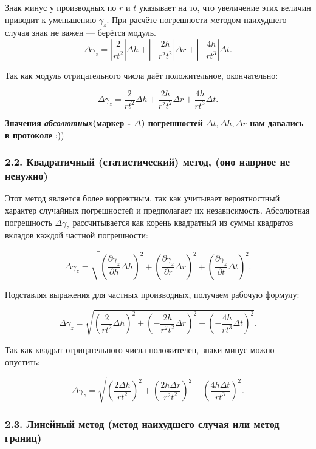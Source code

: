 \documentclass[a4paper,12pt]{article}
\begin{document}
Знак минус у производных по \(r\) и \(t\) указывает на то, что увеличение этих величин приводит к уменьшению \(\gamma_z\). При расчёте погрешности методом наихудшего случая знак не важен — берётся модуль.
\[
\Delta \gamma_z = \left| \frac{2}{r t^2} \right| \Delta h + 
\left| -\frac{2h}{r^2 t^2} \right| \Delta r + 
\left| -\frac{4h}{r t^3} \right| \Delta t.
\]

Так как модуль отрицательного числа даёт положительное, окончательно:

\[
\boxed{\Delta \gamma_z = \frac{2}{r t^2} \Delta h + \frac{2h}{r^2 t^2} \Delta r + \frac{4h}{r t^3} \Delta t}. \tag{3}
\]

\textbf{Значения \textit{абсолютных}(маркер - $\Delta$) погрешностей $\Delta t, \Delta h, \Delta r$ нам давались в протоколе} :))
\subsubsection*{2.2. Квадратичный (статистический) метод, (оно наврное не ненужно)}

Этот метод является более корректным, так как учитывает вероятностный характер случайных погрешностей и предполагает их независимость. Абсолютная погрешность \(\Delta \gamma_z\) рассчитывается как корень квадратный из суммы квадратов вкладов каждой частной погрешности:

\[
\Delta \gamma_z = \sqrt{ \left( \frac{\partial \gamma_z}{\partial h} \Delta h \right)^2 + \left( \frac{\partial \gamma_z}{\partial r} \Delta r \right)^2 + \left( \frac{\partial \gamma_z}{\partial t} \Delta t \right)^2 }.
\]

Подставляя выражения для частных производных, получаем рабочую формулу:

\[
\boxed{\Delta \gamma_z = \sqrt{ \left( \frac{2}{r t^2} \Delta h \right)^2 + \left( -\frac{2h}{r^2 t^2} \Delta r \right)^2 + \left( -\frac{4h}{r t^3} \Delta t \right)^2 }}.
\]

Так как квадрат отрицательного числа положителен, знаки минус можно опустить:

\[
\Delta \gamma_z = \sqrt{ \left( \frac{2 \Delta h}{r t^2} \right)^2 + \left( \frac{2h \Delta r}{r^2 t^2} \right)^2 + \left( \frac{4h \Delta t}{r t^3} \right)^2 }. \tag{2}
\]

\subsubsection*{2.3. Линейный метод (метод наихудшего случая или метод границ)}
\end{document}
